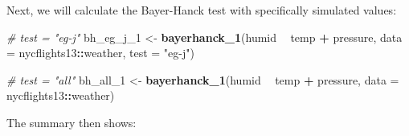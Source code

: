 \documentclass[11pt,a4paper]{article}
\newenvironment{Shaded}{\begin{snugshade}}{\end{snugshade}}
\newcommand{\CommentTok}[1]{\textcolor[rgb]{0.56,0.35,0.01}{\textit{#1}}}
\newcommand{\DataTypeTok}[1]{\textcolor[rgb]{0.13,0.29,0.53}{#1}}
\newcommand{\DecValTok}[1]{\textcolor[rgb]{0.00,0.00,0.81}{#1}}
\newcommand{\KeywordTok}[1]{\textcolor[rgb]{0.13,0.29,0.53}{\textbf{#1}}}
\newcommand{\NormalTok}[1]{#1}
\newcommand{\OperatorTok}[1]{\textcolor[rgb]{0.81,0.36,0.00}{\textbf{#1}}}
\newcommand{\StringTok}[1]{\textcolor[rgb]{0.31,0.60,0.02}{#1}}
\begin{document}
Next, we will calculate the Bayer-Hanck test with specifically simulated
values:

\begin{Shaded}
\begin{Highlighting}[]
\CommentTok{# test = "eg-j"}
\NormalTok{bh_eg_j_}\DecValTok{1}\NormalTok{ <-}\StringTok{ }\KeywordTok{bayerhanck_1}\NormalTok{(humid }\OperatorTok{~}\StringTok{ }\NormalTok{temp }\OperatorTok{+}\StringTok{ }\NormalTok{pressure, }
                          \DataTypeTok{data =}\NormalTok{ nycflights13}\OperatorTok{::}\NormalTok{weather, }
                          \DataTypeTok{test =} \StringTok{"eg-j"}\NormalTok{)}

\CommentTok{# test = "all"}
\NormalTok{bh_all_}\DecValTok{1}\NormalTok{ <-}\StringTok{ }\KeywordTok{bayerhanck_1}\NormalTok{(humid }\OperatorTok{~}\StringTok{ }\NormalTok{temp }\OperatorTok{+}\StringTok{ }\NormalTok{pressure, }
                         \DataTypeTok{data =}\NormalTok{ nycflights13}\OperatorTok{::}\NormalTok{weather)}
\end{Highlighting}
\end{Shaded}

The summary then shows:
\end{document}
